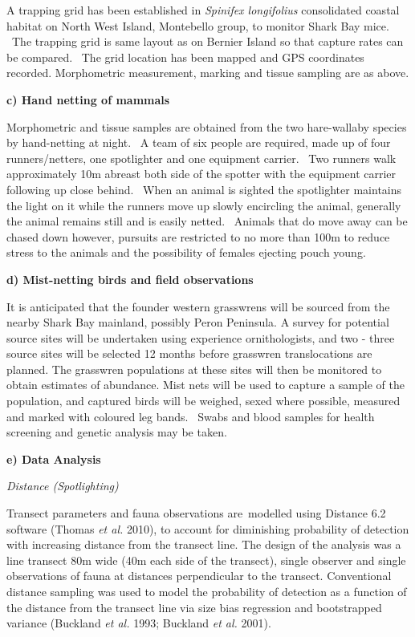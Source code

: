 \documentclass[version=last,
    paper=a4,                               %
    10pt,                                   %
    dvipsnames,
    oneside,                              %
    headings=openany,                       %
    open=any,
    BCOR=7mm,                               %
    DIV=15,     %
]{scrbook}
\begin{document}
A trapping grid has been established in \emph{Spinifex longifolius}
consolidated coastal habitat on North West Island, Montebello group, to
monitor Shark Bay mice. ~The trapping grid is same layout as on Bernier
Island so that capture rates can be compared. ~The grid location has
been mapped and GPS coordinates recorded. Morphometric measurement,
marking and tissue sampling are as above.

\textbf{c) Hand netting of mammals}

Morphometric and tissue samples are obtained from the two hare-wallaby
species by hand-netting at night.~ A team of six people are required,
made up of four runners/netters, one spotlighter and one equipment
carrier.~ Two runners walk approximately 10m abreast both side of the
spotter with the equipment carrier following up close behind.~ When an
animal is sighted the spotlighter maintains the light on it while the
runners move up slowly encircling the animal, generally the animal
remains still and is easily netted.~ Animals that do move away can be
chased down however, pursuits are restricted to no more than 100m to
reduce stress to the animals and the possibility of females ejecting
pouch young.

\textbf{d) Mist-netting birds and field observations}

It is anticipated that the founder western grasswrens will be sourced
from the nearby Shark Bay mainland, possibly Peron Peninsula. A survey
for potential source sites will be undertaken using experience
ornithologists, and two - three source sites will be selected 12 months
before grasswren translocations are planned. The grasswren populations
at these sites will then be monitored to obtain estimates of abundance.
Mist nets will be used to capture a sample of the population, and
captured birds will be weighed, sexed where possible, measured and
marked with coloured leg bands. ~Swabs and blood samples for health
screening and genetic analysis may be taken.

\textbf{e) Data Analysis}

\emph{Distance (Spotlighting)}

Transect parameters and fauna observations are~modelled using Distance
6.2 software (Thomas \emph{et al.} 2010), to account for diminishing
probability of detection with increasing distance from the transect
line. The design of the analysis was a line transect 80m wide (40m each
side of the transect), single observer and single observations of fauna
at distances perpendicular to the transect. Conventional distance
sampling was used to model the probability of detection as a function of
the distance from the transect line via size bias regression and
bootstrapped variance (Buckland \emph{et al.} 1993; Buckland \emph{et
al.} 2001).
\end{document}
